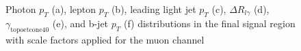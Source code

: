 \begin{figure}[]
\hfil  %
\caption{Photon $p_T$ (a), lepton $p_T$ (b), leading light jet $p_T$ (c), $\Delta R_{l\gamma}$ (d), $\gamma_\text{topoetcone40}$ (e), and b-jet $p_T$ (f) distributions in the final signal region with scale factors applied for the muon channel}
\label{fig:SRmuj1}
\end{figure}


